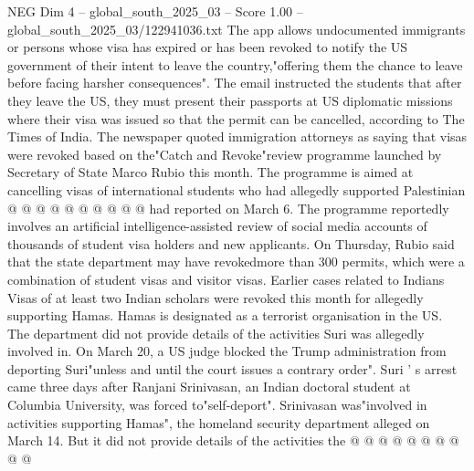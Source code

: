 \begin{textsample}{NEG Dim 4 – global\_south\_2025\_03 – Score 1.00 – global\_south\_2025\_03/122941036.txt}
The app allows undocumented immigrants or persons whose visa has expired or has been revoked to notify the US government of their intent to leave the country,"offering them the chance to leave before facing harsher consequences".
The email instructed the students that after they leave the US, they must present their passports at US diplomatic missions where their visa was issued so that the permit can be cancelled, according to The Times of India.
The newspaper quoted immigration attorneys as saying that visas were revoked based on the"Catch and Revoke"review programme launched by Secretary of State Marco Rubio this month.
The programme is aimed at cancelling visas of international students who had allegedly supported Palestinian @ @ @ @ @ @ @ @ @ @ had reported on March 6.
The programme reportedly involves an artificial intelligence-assisted review of social media accounts of thousands of student visa holders and new applicants.
On Thursday, Rubio said that the state department may have revokedmore than 300 permits, which were a combination of student visas and visitor visas.
Earlier cases related to Indians Visas of at least two Indian scholars were revoked this month for allegedly supporting Hamas.
Hamas is designated as a terrorist organisation in the US.
The department did not provide details of the activities Suri was allegedly involved in.
On March 20, a US judge blocked the Trump administration from deporting Suri"unless and until the court issues a contrary order".
Suri ' s arrest came three days after Ranjani Srinivasan, an Indian doctoral student at Columbia University, was forced to"self-deport".
Srinivasan was"involved in activities supporting Hamas", the homeland security department alleged on March 14.
But it did not provide details of the activities the @ @ @ @ @ @ @ @ @ @

\end{textsample}
